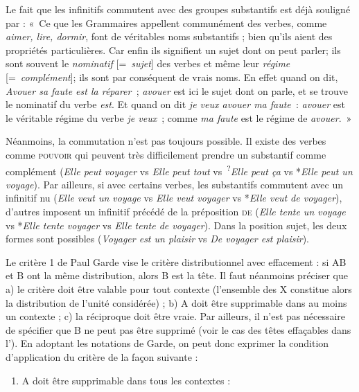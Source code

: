 {     Le fait que les infinitifs commutent avec des groupes substantifs est déjà souligné par \citet[59]{buffier1709grammaire} : «~Ce que les Grammaires appellent communément des verbes, comme \textit{aimer, lire, dormir}, font de véritables noms substantifs ; bien qu’ils aient des propriétés particulières. Car enfin ils signifient un sujet dont on peut parler; ils sont souvent le \textit{nominatif} [=~\textit{sujet}] des verbes et même leur \textit{régime} [=~\textit{complément}]; ils sont par conséquent de vrais noms. En effet quand on dit, \textit{Avouer sa faute est la réparer~}; \textit{avouer} est ici le sujet dont on parle, et se trouve le nominatif du verbe \textit{est}. Et quand on dit \textit{je veux avouer ma faute~}: \textit{avouer} est le véritable régime du verbe \textit{je veux~}; comme \textit{ma faute} est le régime de \textit{avouer}.~»

    Néanmoins, la commutation n’est pas toujours possible. Il existe des verbes comme \textsc{pouvoir} qui peuvent très difficilement prendre un substantif comme complément (\textit{Elle peut voyager} vs \textit{Elle peut tout} vs~\textsuperscript{?}\textit{Elle peut ça} vs *\textit{Elle peut un voyage}). Par ailleurs, si avec certains verbes, les substantifs commutent avec un infinitif nu (\textit{Elle veut un voyage} vs \textit{Elle veut voyager} vs *\textit{Elle veut de voyager}), d’autres imposent un infinitif précédé de la préposition \textsc{de} (\textit{Elle tente un voyage} vs *\textit{Elle tente voyager} vs \textit{Elle tente de voyager}). Dans la position sujet, les deux formes sont possibles (\textit{Voyager est un plaisir} vs \textit{De voyager est plaisir}).

     Le critère 1 de Paul Garde vise le critère distributionnel avec effacement : si AB et B ont la même distribution, alors B est la tête.
    Il faut néanmoins préciser que a)  le critère doit être valable pour tout contexte (l’ensemble des X constitue alors la distribution de l’unité considérée) ; b)  A doit être supprimable dans au moins un contexte ; c)  la réciproque doit être vraie. Par ailleurs, il n’est pas nécessaire de spécifier que B ne peut pas être supprimé (voir le cas des têtes effaçables dans l’). En adoptant les notations de Garde, on peut donc exprimer la condition d'application du critère de la façon suivante :
    \begin{enumerate}[label=1\alph*.]
    \item A doit être supprimable dans tous les contextes :


\end{enumerate}}
